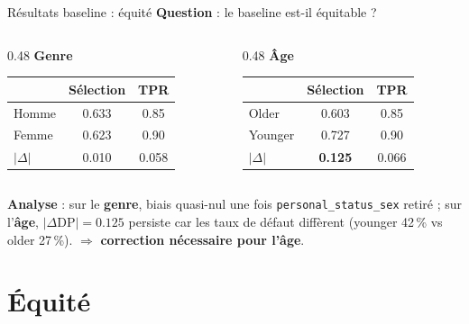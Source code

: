 \documentclass[aspectratio=169, 11pt]{beamer}
\begin{document}
\begin{frame}{R\'esultats baseline : \'equit\'e}
\textbf{Question} : le baseline est-il \'equitable ?

\vspace{0.3em}
\small
\begin{columns}[T]
\begin{column}{0.48\textwidth}
\centering\textbf{Genre}

\begin{tabular}{lcc}
\toprule
& S\'election & TPR \\
\midrule
Homme & 0.633 & 0.85 \\
Femme & 0.623 & 0.90 \\
\midrule
$|\Delta|$ & 0.010 & 0.058 \\
\bottomrule
\end{tabular}
\end{column}
\begin{column}{0.48\textwidth}
\centering\textbf{\^Age}

\begin{tabular}{lcc}
\toprule
& S\'election & TPR \\
\midrule
Older & 0.603 & 0.85 \\
Younger & 0.727 & 0.90 \\
\midrule
$|\Delta|$ & \textbf{0.125} & 0.066 \\
\bottomrule
\end{tabular}
\end{column}
\end{columns}

\vspace{0.5em}
\normalsize
\textbf{Analyse} : sur le \textbf{genre}, biais quasi-nul une fois \texttt{personal\_status\_sex} retir\'e ; sur l'\textbf{\^age}, $|\Delta\text{DP}|=0.125$ persiste car les taux de d\'efaut diff\`erent (younger 42\,\% vs older 27\,\%). $\Rightarrow$ \textbf{correction n\'ecessaire pour l'\^age}.
\end{frame}

\section{\'Equit\'e}
\end{document}
